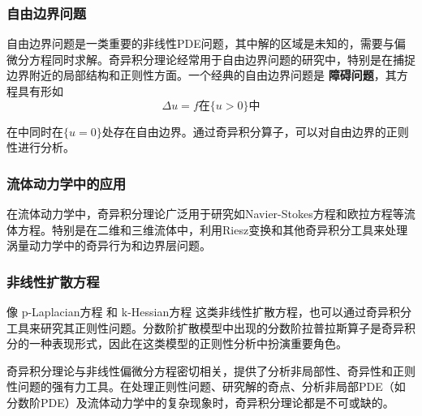 \documentclass{article}
\begin{document}
\subsubsection{自由边界问题}

自由边界问题是一类重要的非线性PDE问题，其中解的区域是未知的，需要与偏微分方程同时求解。奇异积分理论经常用于自由边界问题的研究中，特别是在捕捉边界附近的局部结构和正则性方面。一个经典的自由边界问题是 \textbf{障碍问题}，其方程具有形如
\[
\Delta u = f \text{在}\{u > 0\} \text{中}
\]

在中同时在\( \{ u = 0 \} \)处存在自由边界。通过奇异积分算子，可以对自由边界的正则性进行分析。


\subsubsection{流体动力学中的应用}

在流体动力学中，奇异积分理论广泛用于研究如Navier-Stokes方程和欧拉方程等流体方程。特别是在二维和三维流体中，利用Riesz变换和其他奇异积分工具来处理涡量动力学中的奇异行为和边界层问题。

\subsubsection{非线性扩散方程}
像 p-Laplacian方程 和 k-Hessian方程 这类非线性扩散方程，也可以通过奇异积分工具来研究其正则性问题。分数阶扩散模型中出现的分数阶拉普拉斯算子是奇异积分的一种表现形式，因此在这类模型的正则性分析中扮演重要角色。


奇异积分理论与非线性偏微分方程密切相关，提供了分析非局部性、奇异性和正则性问题的强有力工具。在处理正则性问题、研究解的奇点、分析非局部PDE（如分数阶PDE）及流体动力学中的复杂现象时，奇异积分理论都是不可或缺的。
\end{document}
